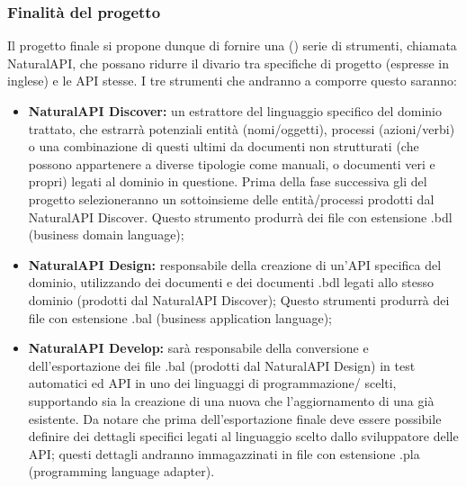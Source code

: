     \subsubsection{Finalità del progetto}
   Il progetto finale si propone dunque di fornire una () serie di strumenti,  chiamata NaturalAPI, che possano ridurre il divario tra specifiche di progetto (espresse in inglese) e le API stesse. I tre strumenti che andranno a comporre questo  saranno:
   \begin{itemize}
   	\item \textbf{NaturalAPI Discover: }un estrattore del linguaggio specifico del dominio trattato, che estrarrà potenziali entità (nomi/oggetti), processi (azioni/verbi) o una combinazione di questi ultimi da documenti non strutturati (che possono appartenere a diverse tipologie come manuali,  o documenti veri e propri) legati al dominio in questione. Prima della fase successiva gli  del progetto selezioneranno un sottoinsieme delle entità/processi prodotti dal NaturalAPI Discover. Questo strumento produrrà dei file con estensione .bdl (business domain language);

   	\item \textbf{NaturalAPI Design: }responsabile della creazione di un'API specifica del dominio, utilizzando dei documenti  e dei documenti .bdl legati allo stesso dominio (prodotti dal NaturalAPI Discover); Questo strumenti produrrà dei file con estensione .bal (business application language);

   	\item \textbf{NaturalAPI Develop: }sarà responsabile della conversione e dell'esportazione dei file .bal (prodotti dal NaturalAPI Design) in test automatici ed API in uno dei linguaggi di programmazione/ scelti, supportando sia la creazione di una nuova  che l'aggiornamento di una già esistente. Da notare che prima dell'esportazione finale deve essere possibile definire dei dettagli specifici legati al linguaggio scelto dallo sviluppatore delle API; questi dettagli andranno immagazzinati in file con estensione .pla (programming language adapter).
   	\end{itemize}

